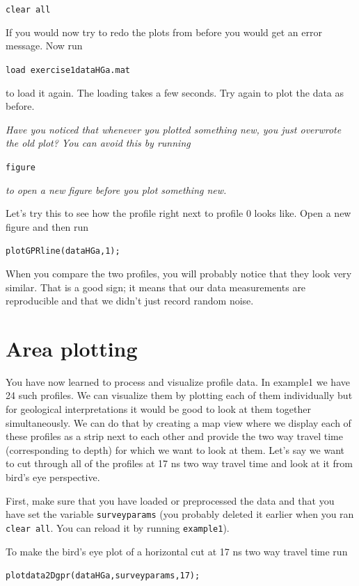 \documentclass[11pt]{article}
\begin{document}
\qquad \verb#clear all#
 
If you would now try to redo the plots from before you would get an
error message. Now run
 
\qquad \verb#load exercise1dataHGa.mat#
 
to load it again.  The loading takes a few seconds. Try again to plot
the data as before.


\emph{Have you noticed that whenever you plotted something new, you
  just overwrote the old plot? You can avoid this by running}

\qquad \verb#figure#

\emph{to open a new figure before you plot something new.}

Let's try this to see how the profile right next to profile 0 looks
like. Open a new figure and then run

\qquad \verb#plotGPRline(dataHGa,1);#
   
When you compare the two profiles, you will probably notice that they look very
similar. That is a good sign; it means that our data measurements are
reproducible and that we didn't just record random noise.
 

\section{Area plotting}

You have now learned to process and visualize profile data. In
example1 we have 24 such profiles. We can visualize them by plotting
each of them individually but for geological interpretations it would
be good to look at them together simultaneously. We can do that by
creating a map view where we display each of these profiles as a strip
next to each other and provide the two way travel time (corresponding
to depth) for which we want to look at them. Let's say we want to cut
through all of the profiles at 17 ns two way travel time and look at
it from bird's eye perspective.

First, make sure that you have loaded or preprocessed the data and
that you have set the variable \verb#surveyparams# (you probably
deleted it earlier when you ran \verb#clear all#. You can reload it by
running \verb#example1#).

To make the bird's eye plot of a horizontal cut at 17 ns two way
travel time run

\qquad \verb#plotdata2Dgpr(dataHGa,surveyparams,17);#
\end{document}
